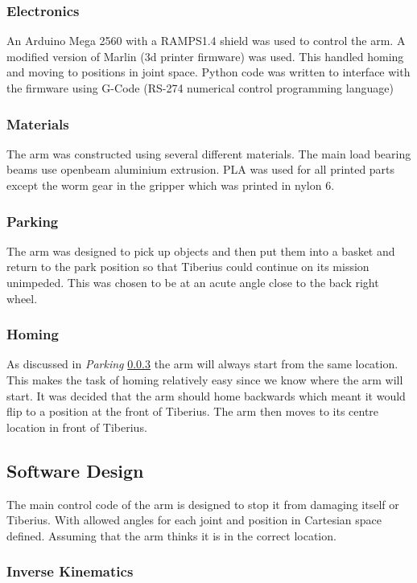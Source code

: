 \subsubsection{Electronics}
An Arduino Mega 2560 with a RAMPS1.4 shield was used to control the arm. A modified version of Marlin (3d printer firmware) was used. This handled homing and moving to positions in joint space. Python code was written to interface with the firmware using G-Code  (RS-274 numerical control programming language) 

\subsubsection{Materials}
The arm was constructed using several different materials. The main load bearing beams use openbeam aluminium extrusion. PLA was used for all printed parts except the worm gear in the gripper which was printed in nylon 6.

\subsubsection{Parking} \label{parking}
The arm was designed to pick up objects and then put them into a basket and return to the park position so that Tiberius could continue on its mission unimpeded. This was chosen to be at an acute angle close to the back right wheel.

\subsubsection{Homing}
As discussed in \textit{Parking} \ref{parking} the arm will always start from the same location. This makes the task of homing relatively easy since we know where the arm will start. It was decided that the arm should home backwards which meant it would flip to a position at the front of Tiberius. The arm then moves to its centre location in front of Tiberius. 



\subsection{Software Design}
The main control code of the arm is designed to stop it from damaging itself or Tiberius. With allowed angles for each joint and position in Cartesian space defined. Assuming that the arm thinks it is in the correct location.

\subsubsection{Inverse Kinematics}

